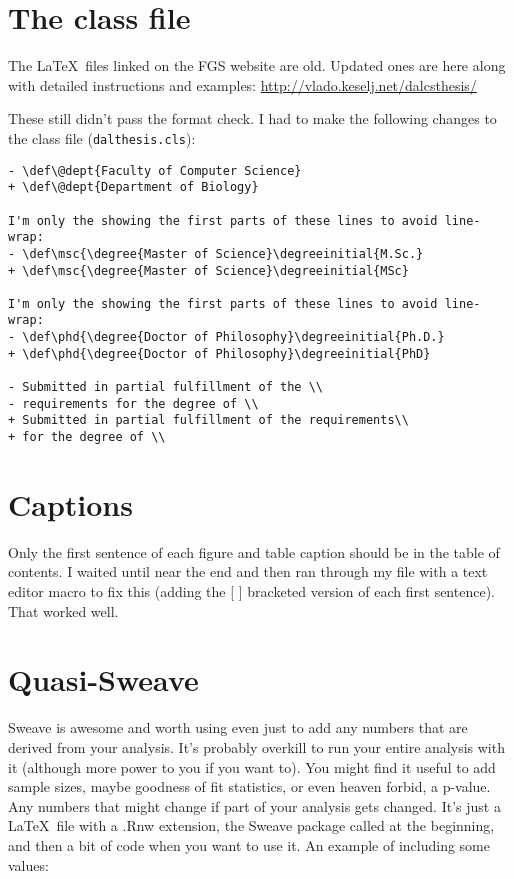 \documentclass[12pt]{article}
\begin{document}
\section{The class file}
The \LaTeX\ files linked on the FGS website are old. Updated ones are here along with detailed instructions and examples:
\url{http://vlado.keselj.net/dalcsthesis/}

These still didn't pass the format check. I had to make the following changes to the class file (\verb#dalthesis.cls#):

\begin{verbatim}
- \def\@dept{Faculty of Computer Science}
+ \def\@dept{Department of Biology}

I'm only the showing the first parts of these lines to avoid line-wrap:
- \def\msc{\degree{Master of Science}\degreeinitial{M.Sc.}
+ \def\msc{\degree{Master of Science}\degreeinitial{MSc}

I'm only the showing the first parts of these lines to avoid line-wrap:
- \def\phd{\degree{Doctor of Philosophy}\degreeinitial{Ph.D.}
+ \def\phd{\degree{Doctor of Philosophy}\degreeinitial{PhD}

- Submitted in partial fulfillment of the \\
- requirements for the degree of \\
+ Submitted in partial fulfillment of the requirements\\
+ for the degree of \\
\end{verbatim}

\section{Captions}
Only the first sentence of each figure and table caption should be in the table of contents. I waited until near the end and then ran through my file with a text editor macro to fix this (adding the [ ] bracketed version of each first sentence). That worked well.

\section{Quasi-Sweave}
Sweave is awesome and worth using even just to add any numbers that are derived from your analysis. It's probably overkill to run your entire analysis with it (although more power to you if you want to). You might find it useful to add sample sizes, maybe goodness of fit statistics, or even heaven forbid, a p-value. Any numbers that might change if part of your analysis gets changed. It's just a \LaTeX\ file with a .Rnw extension, the Sweave package called at the beginning, and then a bit of code when you want to use it. An example of including some values:
\end{document}
